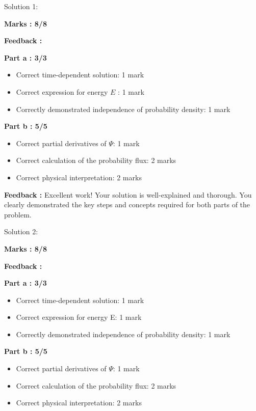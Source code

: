 \documentclass[a4paper,11pt]{article}
\begin{document}
Solution 1:

\textbf{Marks : 8/8}

\textbf{Feedback : }

\textbf{Part a : 3/3}

\begin{itemize}
    \item Correct time-dependent solution: 1 mark
    \item Correct expression for energy $E$ : 1 mark
    \item Correctly demonstrated independence of probability density: 1 mark
\end{itemize}


\textbf{Part b : 5/5}

\begin{itemize}
    \item Correct partial derivatives of $\Psi$: 1 mark
    \item Correct calculation of the probability flux: 2 marks
    \item Correct physical interpretation: 2 marks
\end{itemize}


\textbf{Feedback :}
Excellent work! Your solution is well-explained and thorough. You clearly demonstrated the key steps and concepts required for both parts of the problem.


Solution 2:

\textbf{Marks : 8/8}

\textbf{Feedback : }

\textbf{Part a : 3/3}

\begin{itemize}
    \item Correct time-dependent solution: 1 mark
    \item Correct expression for energy E: 1 mark
    \item Correctly demonstrated independence of probability density: 1 mark
\end{itemize}


\textbf{Part b : 5/5}

\begin{itemize}
    \item Correct partial derivatives of $\Psi$: 1 mark
    \item Correct calculation of the probability flux: 2 marks
    \item Correct physical interpretation: 2 marks
\end{itemize}
\end{document}
